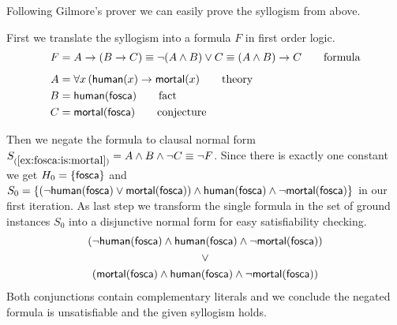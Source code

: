 Following Gilmore's prover we can easily prove the syllogism from above.

\begin{example}\label{ex:fosca:is:mortal}
	First we translate the syllogism into a formula $F$ in first order logic.
	\begin{align*}
	F &= A \rightarrow (B \rightarrow C) \equiv \lnot(A\land B) \lor C \equiv (A\land B)\rightarrow C
	\tag*{formula}
	\\[0.5em]
	A &= \forall x\, ( \mathsf{human}(x) \rightarrow \mathsf{mortal}(x)
	\tag*{theory}
	\\
	B &= \mathsf{human}(\mathsf{fosca})
	\tag*{fact}
	\\
	C &= \mathsf{mortal}(\mathsf{fosca})
	\tag*{conjecture}
	\end{align*}



	Then we negate the formula to clausal normal form $S_{(\ref{ex:fosca:is:mortal})} = A\land B \land\lnot C \equiv \lnot F$.
	Since there is exactly one constant we get
	$H_0 = \{ \mathsf{fosca} \}$ and
	$S_0 =
	\{
	(\lnot\mathsf{human}(\mathsf{fosca})\lor\mathsf{mortal}(\mathsf{fosca}))\land\mathsf{human}(\mathsf{fosca})\land\lnot\mathsf{mortal}(\mathsf{fosca})
	\}$ in our first iteration.
	As last step we transform the single formula in
	the set of ground instances $S_0$ into a disjunctive normal form
	for easy satisfiability checking.
	\begin{gather*}
	(\lnot\mathsf{human}(\mathsf{fosca})\land\mathsf{human}(\mathsf{fosca})\land\lnot\mathsf{mortal}(\mathsf{fosca}))
	\\
	\lor
	\\
	(\mathsf{mortal}(\mathsf{fosca})\land\mathsf{human}(\mathsf{fosca})\land\lnot\mathsf{mortal}(\mathsf{fosca}))
	\end{gather*}
	Both conjunctions contain complementary literals and we conclude the negated formula is unsatisfiable
	and the given syllogism holds.

\end{example}

%

